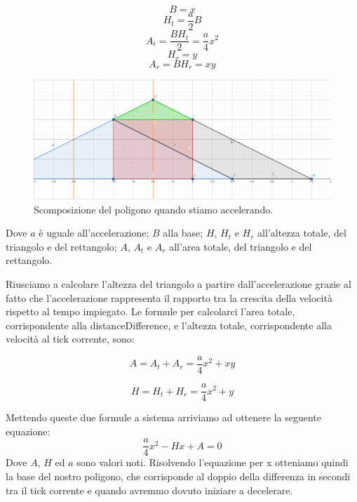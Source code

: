 \documentclass[main.tex]{subfiles}
\begin{document}
\begin{itemize}
    \begin{minipage}{.475\textwidth}
        \[B = x\]
        \[H_t = \frac{a}{2}B\]
        \[A_t = \frac{BH_t}{2} = \frac{a}{4}x^2\]
        \[H_r = y\]
        \[A_r = BH_r = xy\]
    \end{minipage}
    \begin{minipage}{.475\textwidth}
        \begin{figure}[H]
            \centering
            \includegraphics[width=1\linewidth]{img/interpolazione/compensateLateCallAccel2.png}
            \caption{Scomposizione del poligono quando stiamo accelerando.}
            \label{fig:4_compensateLateCallAccel2}
        \end{figure}
    \end{minipage}
    
    Dove $a$ è uguale all'accelerazione; $B$ alla base; $H$, $H_t$ e $H_r$ all'altezza totale, del triangolo e del rettangolo; $A$, $A_t$ e $A_r$ all'area totale, del triangolo e del rettangolo.
    
    Riusciamo a calcolare l'altezza del triangolo a partire dall'accelerazione grazie al fatto che l'accelerazione rappresenta il rapporto tra la crescita della velocità rispetto al tempo impiegato.\newline
    Le formule per calcolarci l'area totale, corrispondente alla distanceDifference, e l'altezza totale, corrispondente alla velocità al tick corrente, sono:
    \hspace{2cm}
    
    \begin{minipage}{.45\textwidth}\[A = A_t + A_r = \frac{a}{4}x^2 + xy\]\end{minipage}
    \begin{minipage}{.45\textwidth}\[H = H_t + H_r = \frac{a}{4}x^2 + y\]\end{minipage}
    
    Mettendo queste due formule a sistema arriviamo ad ottenere la seguente equazione:
    \[\frac{a}{4}x^2 - Hx + A = 0\]
    Dove $A$, $H$ ed $a$ sono valori noti. Risolvendo l'equazione per x otteniamo quindi la base del nostro poligono, che corrisponde al doppio della differenza in secondi tra il tick corrente e quando avremmo dovuto iniziare a decelerare.
\end{itemize}
\end{document}
